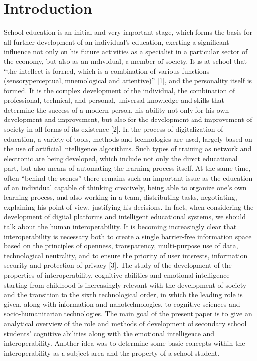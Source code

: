 \documentclass[twocolumn]{article}
\begin{document}
  \section{	Introduction }
School education is an initial and very important stage, which forms the basis for all further development of an individual’s education, exerting a significant influence not only on his future activities as a specialist in a particular sector of the economy, but also as an individual, a member of society. It is at school that “the intellect is formed, which is a combination of various functions (sensoryperceptual, mnemological and attentive)” [1], and the personality itself is formed. It is the complex development of the individual, the combination of professional, technical, and personal, universal knowledge and skills that determine the success of a modern person, his ability not only for his own development and improvement, but also for the development and improvement of society in all forms of its existence [2]. In the process of digitalization of education, a variety of tools, methods and technologies are used, largely based on the use of artificial intelligence algorithms. Such types of training as network and electronic are being developed, which include not only the direct educational part, but also means of automating the learning process itself. At the same time, often “behind the scenes” there remains such an important issue as the education of an individual capable of thinking creatively, being able to organize one’s own learning process, and also working in a team, distributing tasks, negotiating, explaining his point of view, justifying his decisions. In fact, when considering the development of digital platforms and intelligent educational systems, we should talk about the human interoperability. It is becoming increasingly clear that interoperability is necessary both to create a single barrier-free information space based on the principles of openness, transparency, multi-purpose use of data, technological neutrality, and to ensure the priority of user interests, information security and protection of privacy [3]. The study of the development of the properties of interoperability, cognitive abilities and emotional intelligence starting from childhood is increasingly relevant with the development of society and the transition to the sixth technological order, in which the leading role is given, along with information and nanotechnologies, to cognitive sciences and socio-humanitarian technologies. The main goal of the present paper is to give an analytical overview of the role and methods of development of secondary school students’ cognitive abilities along with the emotional intelligence and interoperability. Another idea was to determine some basic concepts within the interoperability as a subject area and the property of a school student.
\end{document}
